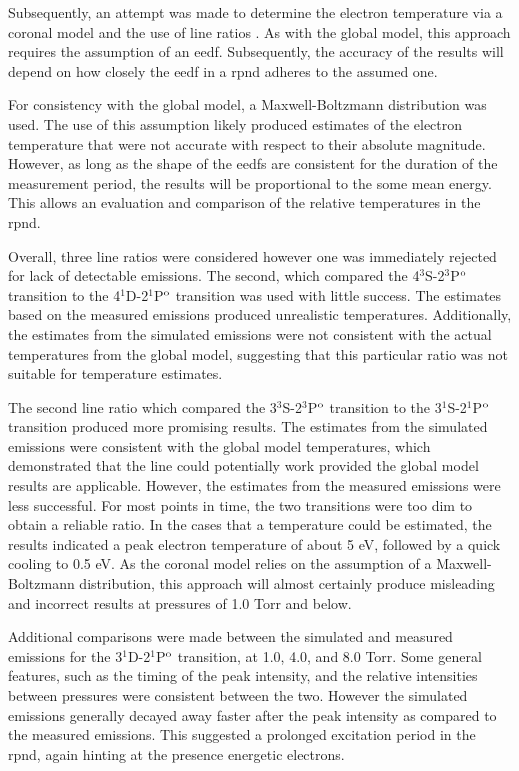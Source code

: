 Subsequently, an attempt was made to determine the electron temperature via a
coronal model and the use of line ratios \cite{Griem2005}. As with the global
model, this approach requires the assumption of an \acs{eedf}. Subsequently, the
accuracy of the results will depend on how closely the \acs{eedf} in a
\acs{rpnd} adheres to the assumed one.

For consistency with the global model, a Maxwell-Boltzmann distribution was
used. The use of this assumption likely produced estimates of the electron
temperature that were not accurate with respect to their absolute magnitude.
However, as long as the shape of the \acs{eedf}s are consistent for the duration
of the measurement period, the results will be proportional to the some mean
energy. This allows an evaluation and comparison of the relative temperatures in
the \acs{rpnd}.

Overall, three line ratios were considered however one was immediately rejected
for lack of detectable emissions. The second, which compared the
4$^3$S-2$^3$P$^\mathrm{o}$ transition to the 4$^1$D-2$^1$P$^\mathrm{o}$ transition was used
with little success. The estimates based on the measured emissions produced
unrealistic temperatures. Additionally, the estimates from the simulated
emissions were not consistent with the actual temperatures from the global
model, suggesting that this particular ratio was not suitable for temperature
estimates.

The second line ratio which compared the 3$^3$S-2$^3$P$^\mathrm{o}$ transition to the
3$^1$S-2$^1$P$^\mathrm{o}$ transition produced more promising results. The estimates
from the simulated emissions were consistent with the global model temperatures,
which demonstrated that the line could potentially work provided the global
model results are applicable. However, the estimates from the measured emissions
were less successful. For most points in time, the two transitions were too dim
to obtain a reliable ratio. In the cases that a temperature could be estimated,
the results indicated a peak electron temperature of about 5 eV, followed by a
quick cooling to 0.5 eV. As the coronal model relies on the assumption of a
Maxwell-Boltzmann distribution, this approach will almost certainly produce
misleading and incorrect results at pressures of 1.0 Torr and below.

Additional comparisons were made between the simulated and measured emissions
for the 3$^1$D-2$^1$P$^\mathrm{o}$ transition, at 1.0, 4.0, and 8.0 Torr. Some general
features, such as the timing of the peak intensity, and the relative intensities
between pressures were consistent between the two. However the simulated
emissions generally decayed away faster after the peak intensity as compared to
the measured emissions. This suggested a prolonged excitation period in the
\acs{rpnd}, again hinting at the presence energetic electrons.

